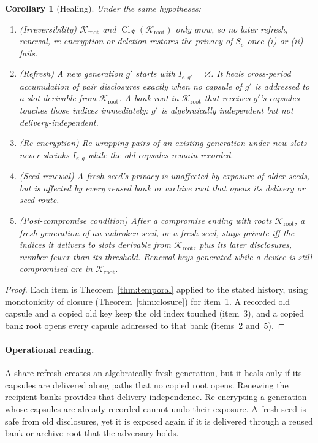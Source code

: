 \documentclass[pdflatex,sn-mathphys-num]{sn-jnl}%
\theoremstyle{plain}
\newtheorem{corollary}[theorem]{Corollary}
\theoremstyle{definition}
\newcommand{\Cl}{\operatorname{Cl}}
\begin{document}
\begin{corollary}[Healing]\label{cor:healing}
Under the same hypotheses:
\begin{enumerate}
\item (Irreversibility) $\mathcal K_{\mathrm{root}}$ and $\Cl_{\mathcal R}(\mathcal K_{\mathrm{root}})$ only grow, so no later refresh, renewal, re-encryption or deletion restores the privacy of $S_e$ once (i) or (ii) fails.
\item (Refresh) A new generation $g'$ starts with $I_{e,g'}=\varnothing$. It heals cross-period accumulation of pair disclosures exactly when no capsule of $g'$ is addressed to a slot derivable from $\mathcal K_{\mathrm{root}}$. A bank root in $\mathcal K_{\mathrm{root}}$ that receives $g'$'s capsules touches those indices immediately: $g'$ is algebraically independent but not delivery-independent.
\item (Re-encryption) Re-wrapping pairs of an existing generation under new slots never shrinks $I_{e,g}$ while the old capsules remain recorded.
\item (Seed renewal) A fresh seed's privacy is unaffected by exposure of older seeds, but is affected by every reused bank or archive root that opens its delivery or seed route.
\item (Post-compromise condition) After a compromise ending with roots $\mathcal K_{\mathrm{root}}$, a fresh generation of an unbroken seed, or a fresh seed, stays private iff the indices it delivers to slots derivable from $\mathcal K_{\mathrm{root}}$, plus its later disclosures, number fewer than its threshold. Renewal keys generated while a device is still compromised are in $\mathcal K_{\mathrm{root}}$.
\end{enumerate}
\end{corollary}
\begin{proof}
Each item is Theorem~\ref{thm:temporal} applied to the stated history, using monotonicity of closure (Theorem~\ref{thm:closure}) for item~1. A recorded old capsule and a copied old key keep the old index touched (item~3), and a copied bank root opens every capsule addressed to that bank (items~2 and~5).
\end{proof}

\paragraph{Operational reading.}
A share refresh creates an algebraically fresh generation, but it heals only if its capsules are delivered along paths that no copied root opens. Renewing the recipient banks provides that delivery independence. Re-encrypting a generation whose capsules are already recorded cannot undo their exposure. A fresh seed is safe from old disclosures, yet it is exposed again if it is delivered through a reused bank or archive root that the adversary holds.
\end{document}

